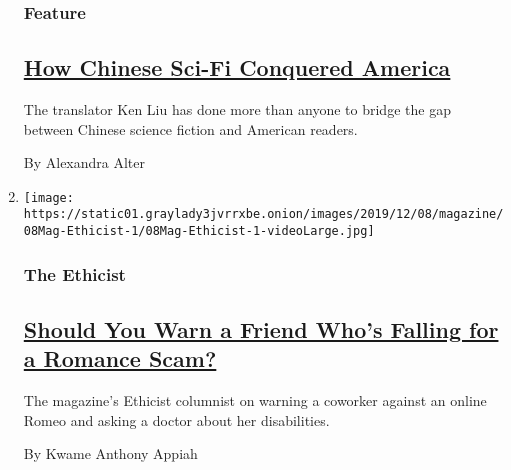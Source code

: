 \begin{enumerate}
  \hypertarget{feature-2}{%
  \subsubsection{Feature}\label{feature-2}}

  \hypertarget{how-chinese-sci-fi-conquered-america}{%
  \subsection{\texorpdfstring{\href{/2019/12/03/magazine/ken-liu-three-body-problem-chinese-science-fiction.html}{How
  Chinese Sci-Fi Conquered
  America}}{How Chinese Sci-Fi Conquered America}}\label{how-chinese-sci-fi-conquered-america}}

  The translator Ken Liu has done more than anyone to bridge the gap
  between Chinese science fiction and American readers.

  By Alexandra Alter
\item
  \texttt{[image: https://static01.graylady3jvrrxbe.onion/images/2019/12/08/magazine/08Mag-Ethicist-1/08Mag-Ethicist-1-videoLarge.jpg]}

  \hypertarget{the-ethicist}{%
  \subsubsection{The Ethicist}\label{the-ethicist}}

  \hypertarget{should-you-warn-a-friend-whos-falling-for-a-romance-scam}{%
  \subsection{\texorpdfstring{\href{/2019/12/03/magazine/should-you-warn-a-friend-whos-falling-for-a-romance-scam.html}{Should
  You Warn a Friend Who's Falling for a Romance
  Scam?}}{Should You Warn a Friend Who's Falling for a Romance Scam?}}\label{should-you-warn-a-friend-whos-falling-for-a-romance-scam}}

  The magazine's Ethicist columnist on warning a coworker against an
  online Romeo and asking a doctor about her disabilities.

  By Kwame Anthony Appiah
\end{enumerate}

